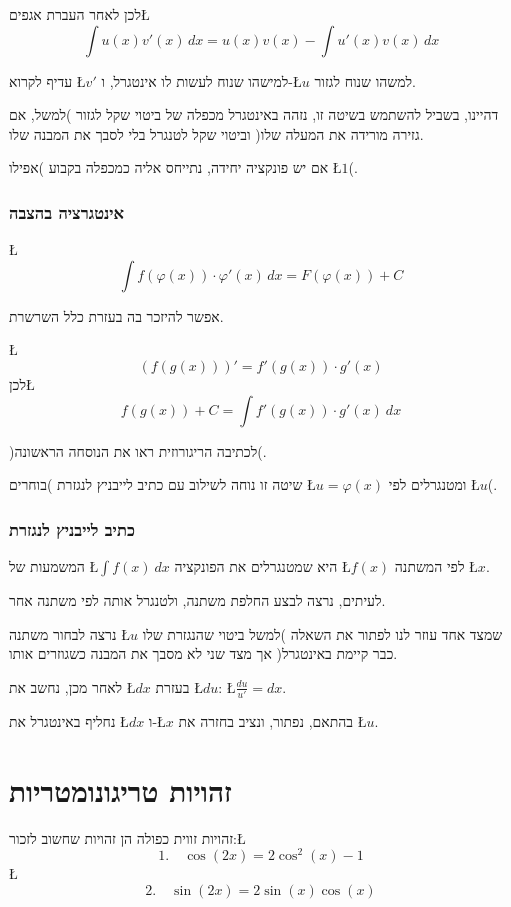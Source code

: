 \documentclass[english,hebrew]{article}
\begin{document}
לכן לאחר העברת אגפים\L{%
\[
\int u(x)v'(x)\,dx=u(x)v(x)-\int u'(x)v(x)\,dx
\]
}%

עדיף לקרוא \L{$v'$} למישהו שנוח לעשות לו אינטגרל, ו-\L{$u$} למשהו
שנוח לגזור. 

דהיינו, בשביל להשתמש בשיטה זו, נזהה באינטגרל מכפלה של ביטוי שקל לגזור
)למשל, אם גזירה מורידה את המעלה שלו( וביטוי שקל לטנגרל בלי לסבך את
המבנה שלו.

אם יש פונקציה יחידה, נתייחס אליה כמכפלה בקבוע )אפילו \L{$1$}(.

\section{אינטגרציה בהצבה}

\L{%
\[
\int f(\varphi(x))\cdot\varphi'(x)\,dx=F(\varphi(x))+C
\]
}%

אפשר להיזכר בה בעזרת כלל השרשרת.

\L{%
\[
\left(f(g(x))\right)'=f'(g(x))\cdot g'(x)
\]
}%
לכן\L{%
\[
f(g(x))+C=\int f'(g(x))\cdot g'(x)\ dx
\]
}%

)לכתיבה הריגורוזית ראו את הנוסחה הראשונה(.

שיטה זו נוחה לשילוב עם כתיב לייבניץ לנגזרת )בוחרים \L{$u=\varphi(x)$}
ומטנגרלים לפי \L{$u$}(. 

\section{כתיב לייבניץ לנגזרת}

המשמעות של \L{$\int f(x)\ dx$} היא שמטנגרלים את הפונקציה \L{$f(x)$}
לפי המשתנה \L{$x$}.

לעיתים, נרצה לבצע החלפת משתנה, ולטנגרל אותה לפי משתנה אחר.

נרצה לבחור משתנה \L{$u$} שמצד אחד עוזר לנו לפתור את השאלה )למשל ביטוי
שהנגזרת שלו כבר קיימת באינטגרל( אך מצד שני לא מסבך את המבנה כשגוזרים
אותו.

לאחר מכן, נחשב את \L{$dx$} בעזרת \L{$du$}: \L{$\frac{du}{u'}=dx$}. 

נחליף באינטגרל את \L{$dx$} ו-\L{$x$} בהתאם, נפתור, ונציב בחזרה את
\L{$u$}.

\newpage{}

\part{זהויות טריגונומטריות}

זהויות זווית כפולה הן זהויות שחשוב לזכור:\L{%
\[
1.\quad\cos\left(2x\right)=2\cos^{2}(x)-1
\]
}%
\L{%
\[
2.\quad\sin(2x)=2\sin(x)\cos(x)
\]
}%
\end{document}
